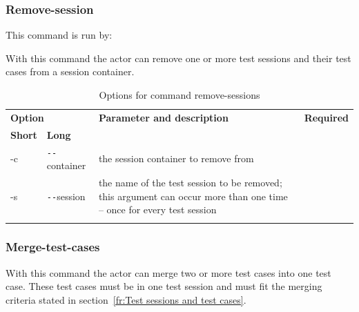 \subsubsection{Remove-session}
This command is run by:
\begin{quote}
\end{quote}
\par
With this command the actor can remove one or more test sessions and their test cases from a session container.

\begin{longtable}{|l|l|p{73mm}|c|}\hline
   \multicolumn{2}{|l|}{\textbf{Option}} & 
   {\textbf{Parameter and description}} & 
   {\textbf{Required}} \\
   {\textbf{Short}} &
   {\textbf{Long}} &
    & 
    \\\hline \hline \endhead
   -c & \verb$--$container & the session container to remove from & \x \\\hline
   -s & \verb$--$session & the name of the test session to be removed; this argument can occur more than one time -- once for every test session & \x \\\hline
  \caption{Options for command remove-sessions}
  \label{fr_tb:Options for command remove-sessions}
\end{longtable}

\subsubsection{Merge-test-cases}
\begin{quote}
\end{quote}
\par
With this command the actor can merge two or more test cases into one test case. These test cases must be in one test session and must fit the merging criteria stated in section~\ref{fr:Test sessions and test cases}.

